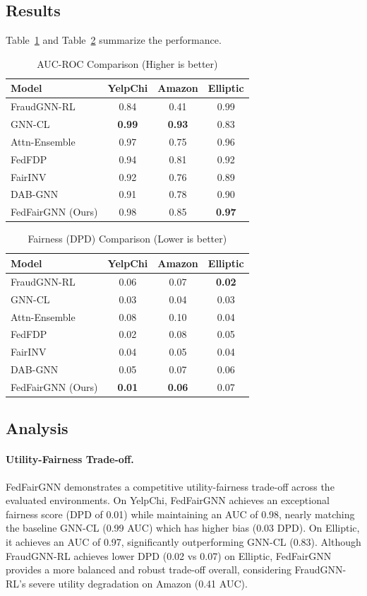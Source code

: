 \documentclass[pmlr]{jmlr}%
\begin{document}
\subsection{Results}
Table~\ref{tab:auc} and Table~\ref{tab:dpd} summarize the performance.

\begin{table}[t]
\centering
\caption{AUC-ROC Comparison (Higher is better)}
\label{tab:auc}
\begin{tabular}{lccc}
\toprule
Model & YelpChi & Amazon & Elliptic \\
\midrule
FraudGNN-RL & 0.84 & 0.41 & 0.99 \\
GNN-CL & \textbf{0.99} & \textbf{0.93} & 0.83 \\
Attn-Ensemble & 0.97 & 0.75 & 0.96 \\
FedFDP & 0.94 & 0.81 & 0.92 \\
FairINV & 0.92 & 0.76 & 0.89 \\
DAB-GNN & 0.91 & 0.78 & 0.90 \\
\midrule
FedFairGNN (Ours) & 0.98 & 0.85 & \textbf{0.97} \\
\bottomrule
\end{tabular}
\end{table}

\begin{table}[t]
\centering
\caption{Fairness (DPD) Comparison (Lower is better)}
\label{tab:dpd}
\begin{tabular}{lccc}
\toprule
Model & YelpChi & Amazon & Elliptic \\
\midrule
FraudGNN-RL & 0.06 & 0.07 & \textbf{0.02} \\
GNN-CL & 0.03 & 0.04 & 0.03 \\
Attn-Ensemble & 0.08 & 0.10 & 0.04 \\
FedFDP & 0.02 & 0.08 & 0.05 \\
FairINV & 0.04 & 0.05 & 0.04 \\
DAB-GNN & 0.05 & 0.07 & 0.06 \\
\midrule
FedFairGNN (Ours) & \textbf{0.01} & \textbf{0.06} & 0.07 \\
\bottomrule
\end{tabular}
\end{table}

\subsection{Analysis}

\paragraph{Utility-Fairness Trade-off.}
FedFairGNN demonstrates a competitive utility-fairness trade-off across the evaluated environments. On YelpChi, FedFairGNN achieves an exceptional fairness score (DPD of 0.01) while maintaining an AUC of 0.98, nearly matching the baseline GNN-CL (0.99 AUC) which has higher bias (0.03 DPD). On Elliptic, it achieves an AUC of 0.97, significantly outperforming GNN-CL (0.83). Although FraudGNN-RL achieves lower DPD (0.02 vs 0.07) on Elliptic, FedFairGNN provides a more balanced and robust trade-off overall, considering FraudGNN-RL's severe utility degradation on Amazon (0.41 AUC).
\end{document}

